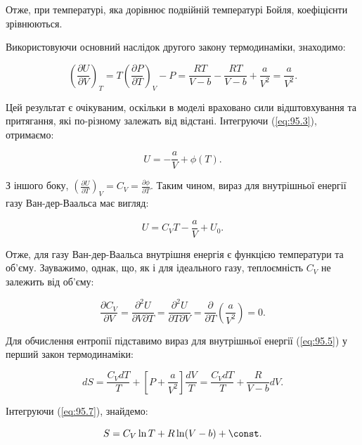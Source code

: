Отже, при температурі, яка дорівнює подвійній температурі Бойля, коефіцієнти зрівнюються.

Використовуючи основний наслідок другого закону термодинаміки, знаходимо:

\begin{equation}
\left( \frac{\partial U}{\partial V} \right)_{T} = T\left( \frac{\partial P}{\partial T} \right)_{V} -
P = \frac{RT}{V - b} - \frac{RT}{V - b} + \frac{a}{V^{2}} = \frac{a}{V^{2}}.
\label{eq:95.3}
\end{equation}

Цей результат є очікуваним, оскільки в моделі враховано сили відштовхування та притягання, які
по-різному залежать від відстані. Інтегруючи (\ref{eq:95.3}), отримаємо:

\begin{equation}
U = -\frac{a}{V} + \phi(T).
\label{eq:95.4}
\end{equation}

З іншого боку, $\left( \frac{\partial U}{\partial T} \right)_{V} = C_{V} = \frac{\partial
\phi}{\partial T}$. Таким чином, вираз для внутрішньої енергії газу Ван-дер-Ваальса має вигляд:

\begin{equation}
U = C_{V}T - \frac{a}{V} + U_{0}.
\label{eq:95.5}
\end{equation}

Отже, для газу Ван-дер-Ваальса внутрішня енергія є функцією температури та об'єму. Зауважимо, однак,
що, як і для ідеального газу, теплоємність $C_{V}$ не залежить від об'єму:

\begin{equation}
\frac{\partial C_{V}}{\partial V} = \frac{\partial^{2}U}{\partial V \partial T} =
\frac{\partial^{2}U}{\partial T \partial V} = \frac{\partial}{\partial T}\left( \frac{a}{V^{2}}
\right) = 0.
\label{eq:95.6}
\end{equation}

Для обчислення ентропії підставимо вираз для внутрішньої енергії (\ref{eq:95.5}) у перший закон
термодинаміки:

\begin{equation}
dS = \frac{C_{V}dT}{T} + \left[ P + \frac{a}{V^{2}} \right]\frac{dV}{T} = \frac{C_{V}dT}{T} +
\frac{R}{V - b}dV.
\label{eq:95.7}
\end{equation}

Інтегруючи (\ref{eq:95.7}), знайдемо:

\begin{equation}
S = C_{V}\ln T + R \ln (V - b) + \const.
\label{eq:95.8}
\end{equation}

